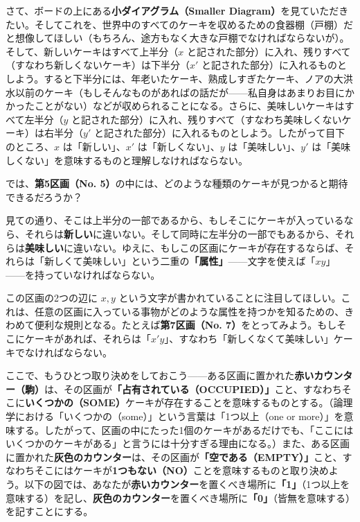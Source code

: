 \documentclass[a4paper,11pt,openany]{ltjsbook}
\begin{document}
さて、ボードの上にある\textbf{小ダイアグラム（Smaller Diagram）}を見ていただきたい。そしてこれを、世界中のすべてのケーキを収めるための食器棚（戸棚）だと想像してほしい（もちろん、途方もなく大きな戸棚でなければならないが）。そして、新しいケーキはすべて上半分（$x$ と記された部分）に入れ、残りすべて（すなわち新しくないケーキ）は下半分（$x'$ と記された部分）に入れるものとしよう。すると下半分には、年老いたケーキ、熟成しすぎたケーキ、ノアの大洪水以前のケーキ（もしそんなものがあればの話だが——私自身はあまりお目にかかったことがない）などが収められることになる。さらに、美味しいケーキはすべて左半分（$y$ と記された部分）に入れ、残りすべて（すなわち美味しくないケーキ）は右半分（$y'$ と記された部分）に入れるものとしよう。したがって目下のところ、$x$ は「新しい」、$x'$ は「新しくない」、$y$ は「美味しい」、$y'$ は「美味しくない」を意味するものと理解しなければならない。

では、\textbf{第5区画（No. 5）}の中には、どのような種類のケーキが見つかると期待できるだろうか？

見ての通り、そこは上半分の一部であるから、もしそこにケーキが入っているなら、それらは\textbf{新しい}に違いない。そして同時に左半分の一部でもあるから、それらは\textbf{美味しい}に違いない。ゆえに、もしこの区画にケーキが存在するならば、それらは「新しくて美味しい」という二重の\textbf{「属性」}——文字を使えば「$x y$」——を持っていなければならない。

この区画の2つの辺に $x, y$ という文字が書かれていることに注目してほしい。これは、任意の区画に入っている事物がどのような属性を持つかを知るための、きわめて便利な規則となる。たとえば\textbf{第7区画（No. 7）}をとってみよう。もしそこにケーキがあれば、それらは「$x' y$」、すなわち「新しくなくて美味しい」ケーキでなければならない。

ここで、もうひとつ取り決めをしておこう——ある区画に置かれた\textbf{赤いカウンター（駒）}は、その区画が\textbf{「占有されている（OCCUPIED）」}こと、すなわちそこに\textbf{いくつかの（SOME）}ケーキが存在することを意味するものとする。（論理学における「いくつかの（some）」という言葉は「1つ以上（one or more）」を意味する。したがって、区画の中にたった1個のケーキがあるだけでも、「ここにはいくつかのケーキがある」と言うには十分すぎる理由になる。）また、ある区画に置かれた\textbf{灰色のカウンター}は、その区画が\textbf{「空である（EMPTY）」}こと、すなわちそこにはケーキが\textbf{1つもない（NO）}ことを意味するものと取り決めよう。以下の図では、あなたが\textbf{赤いカウンター}を置くべき場所に\textbf{「1」}（1つ以上を意味する）を記し、\textbf{灰色のカウンター}を置くべき場所に\textbf{「0」}（皆無を意味する）を記すことにする。
\end{document}
